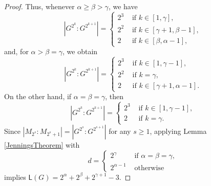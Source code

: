\documentclass[a4paper,11pt]{article}
\numberwithin{equation}{section}
\begin{document}
\begin{proof}
\noindent Thus, whenever $\alpha\geq\beta>\gamma$, we have
$$|G^{2^k}:G^{2^{k+1}}|=
\begin{cases}
2^3 &\mbox { if } k \in [1, \gamma], \\
2^2 &\mbox { if } k \in [\gamma +1, \beta -1], \\
2 &\mbox { if } k\in [\beta, \alpha -1],
\end{cases}
$$
\noindent and, for $\alpha>\beta=\gamma$, we obtain
$$|G^{2^k}:G^{2^{k+1}}|=
\begin{cases}
2^3 &\mbox { if } k \in [1, \gamma -1], \\
2^2 &\mbox { if } k=\gamma, \\
2 &\mbox { if } k \in [\gamma +1, \alpha -1].
\end{cases}
$$
\noindent On the other hand, if $\alpha=\beta=\gamma$, then
$$|G^{2^k}:G^{2^{k+1}}|=
\begin{cases}
2^3 &\mbox { if } k \in [1, \gamma -1], \\
2 &\mbox { if } k=\gamma.
\end{cases}
$$
\noindent Since $|M_{2^s}:M_{2^{s}+1}|=|G^{2^s}:G^{2^{s+1}}|$ for any $s\geq 1$, applying Lemma \ref{JenningsTheorem} with
\begin{equation*}
    d=
    \begin{cases}
        2^{\gamma} & \text{ if } \alpha=\beta=\gamma,\\
        2^{\alpha-1} & \text{ otherwise }
    \end{cases}
\end{equation*} implies $\mathsf{L}(G)= 2^\alpha +2^\beta +2^{\gamma+1}-3$. 
\end{proof}
\end{document}
